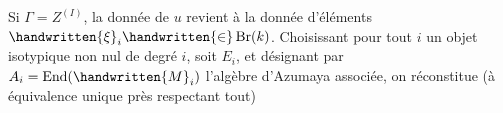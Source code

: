 
Si $\Gamma=Z^{(I)}$, la donnée de $u$ revient à la donnée d'éléments $\handwritten{\xi}_i\handwritten{\in}\operatorname{Br}(k)$. Choisissant pour tout $i$ un objet isotypique non nul de degré $i$, soit $E_i$, et désignant par $A_i=\operatorname{End}(\handwritten{M}_i)$ l'algèbre d'Azumaya associée, on réconstitue (à équivalence unique près\deleted{)} respectant tout)
